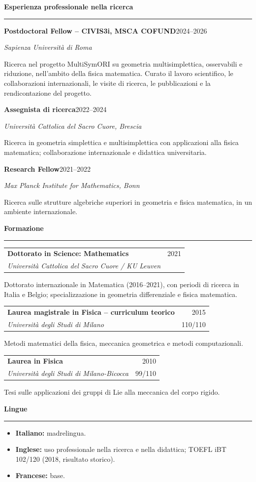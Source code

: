 \documentclass[10pt,a4paper]{article}
\makeatletter
\newcommand{\cvsection}[1]{%
    \Needspace{4\baselineskip}%
    \vspace{0.8em}%
    {\large\bfseries\color{accent} #1}\par
    \vspace{0.2em}\hrule\vspace{0.45em}%
}
\newcommand{\entry}[4]{%
    \Needspace{4\baselineskip}%
    \textbf{#1}\hfill #2\par
    \textit{#3}\par
    #4\par\vspace{0.45em}%
}
\newcommand{\education}[5]{%
    \Needspace{5\baselineskip}%
    \begin{tabularx}{\textwidth}{@{}>{\raggedright\arraybackslash}Xr@{}}
        \textbf{#1} & #2 \\
        \textit{#4} & #3
    \end{tabularx}\par
    #5\par\vspace{0.45em}%
}
\makeatother
\begin{document}
\cvsection{Esperienza professionale nella ricerca}
\entry{Postdoctoral Fellow -- CIVIS3i, MSCA COFUND}{2024--2026}{Sapienza Università di Roma}{%
Ricerca nel progetto MultiSymORI su geometria multisimplettica, osservabili e riduzione, nell'ambito della fisica matematica.
Curato il lavoro scientifico, le collaborazioni internazionali, le visite di ricerca, le pubblicazioni e la rendicontazione del progetto.
}
\entry{Assegnista di ricerca}{2022--2024}{Università Cattolica del Sacro Cuore, Brescia}{%
Ricerca in geometria simplettica e multisimplettica con applicazioni alla fisica matematica; collaborazione internazionale e didattica universitaria.}
\entry{Research Fellow}{2021--2022}{Max Planck Institute for Mathematics, Bonn}{%
Ricerca sulle strutture algebriche superiori in geometria e fisica matematica, in un ambiente internazionale.}

\cvsection{Formazione}
\education{Dottorato in Science: Mathematics}{2021}{}{Università Cattolica del Sacro Cuore / KU Leuven}{%
Dottorato internazionale in Matematica (2016--2021), con periodi di ricerca in Italia e Belgio; specializzazione in geometria differenziale e fisica matematica.}
\education{Laurea magistrale in Fisica -- curriculum teorico}{2015}{110/110}{Università degli Studi di Milano}{%
Metodi matematici della fisica, meccanica geometrica e metodi computazionali.}
\education{Laurea in Fisica}{2010}{99/110}{Università degli Studi di Milano-Bicocca}{%
Tesi sulle applicazioni dei gruppi di Lie alla meccanica del corpo rigido.}

\cvsection{Lingue}
\begin{itemize}
    \item \textbf{Italiano:} madrelingua.
    \item \textbf{Inglese:} uso professionale nella ricerca e nella didattica; TOEFL iBT 102/120 (2018, risultato storico).
    \item \textbf{Francese:} base.
\end{itemize}
\end{document}
